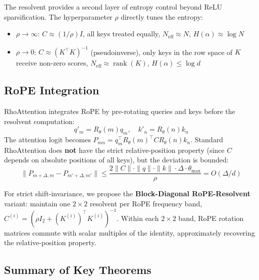 \documentclass[11pt,a4paper]{article}
\theoremstyle{remark}
\DeclareMathOperator{\rank}{rank}
\begin{document}
The resolvent provides a second layer of entropy control beyond ReLU sparsification. The hyperparameter $\rho$ directly tunes the entropy:
\begin{itemize}
    \item $\rho \to \infty$: $C \approx (1/\rho)I$, all keys treated equally, $N_{\text{eff}} \approx N$, $H(\alpha) \approx \log N$
    \item $\rho \to 0$: $C \approx (K^\top K)^{-1}$ (pseudoinverse), only keys in the row space of $K$ receive non-zero scores, $N_{\text{eff}} \approx \rank(K)$, $H(\alpha) \leq \log d$
\end{itemize}

\subsection{RoPE Integration}

RhoAttention integrates RoPE by pre-rotating queries and keys before the resolvent computation:
\begin{equation}
q'_m = R_\theta(m) q_m, \quad k'_n = R_\theta(n) k_n
\end{equation}
The attention logit becomes $P_{mn} = q_m^\top R_\theta(m)^\top C R_\theta(n) k_n$. Standard RhoAttention does \textbf{not} have the strict relative-position property (since $C$ depends on absolute positions of all keys), but the deviation is bounded:
\begin{equation}
\|P_{m+\Delta, m} - P_{m'+\Delta, m'}\| \leq \frac{2\|C\| \cdot \|q\| \cdot \|k\| \cdot \Delta \cdot \theta_{\max}}{\rho} = O(\Delta/d)
\end{equation}

For strict shift-invariance, we propose the \textbf{Block-Diagonal RoPE-Resolvent} variant: maintain one $2 \times 2$ resolvent per RoPE frequency band, $C^{(i)} = (\rho I_2 + (K^{(i)})^\top K^{(i)})^{-1}$. Within each $2 \times 2$ band, RoPE rotation matrices commute with scalar multiples of the identity, approximately recovering the relative-position property.

\subsection{Summary of Key Theorems}
\end{document}
